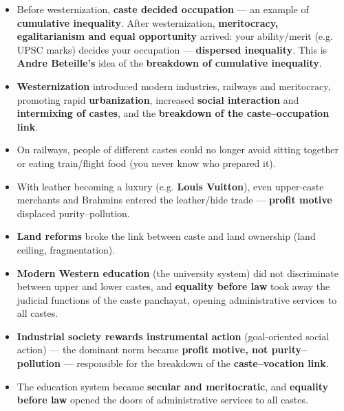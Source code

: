 \begin{KeyConcept}
\begin{itemize}
\item Before westernization, \textbf{caste decided occupation} --- an example of \textbf{cumulative inequality}. After westernization, \textbf{meritocracy, egalitarianism and equal opportunity} arrived: your ability/merit (e.g. UPSC marks) decides your occupation --- \textbf{dispersed inequality}. This is \textbf{Andre Beteille's} idea of the \textbf{breakdown of cumulative inequality}.
\item \textbf{Westernization} introduced modern industries, railways and meritocracy, promoting rapid \textbf{urbanization}, increased \textbf{social interaction} and \textbf{intermixing of castes}, and the \textbf{breakdown of the caste--occupation link}.
\item On railways, people of different castes could no longer avoid sitting together or eating train/flight food (you never know who prepared it).
\item With leather becoming a luxury (e.g. \textbf{Louis Vuitton}), even upper-caste merchants and Brahmins entered the leather/hide trade --- \textbf{profit motive} displaced purity--pollution.
\item \textbf{Land reforms} broke the link between caste and land ownership (land ceiling, fragmentation).
\item \textbf{Modern Western education} (the university system) did not discriminate between upper and lower castes, and \textbf{equality before law} took away the judicial functions of the caste panchayat, opening administrative services to all castes.
\end{itemize}
\end{KeyConcept}

\begin{KeyConcept}
\begin{itemize}
\item \textbf{Industrial society rewards instrumental action} (goal-oriented social action) --- the dominant norm became \textbf{profit motive, not purity--pollution} --- responsible for the breakdown of the \textbf{caste--vocation link}.
\item The education system became \textbf{secular and meritocratic}, and \textbf{equality before law} opened the doors of administrative services to all castes.
\end{itemize}
\end{KeyConcept}

